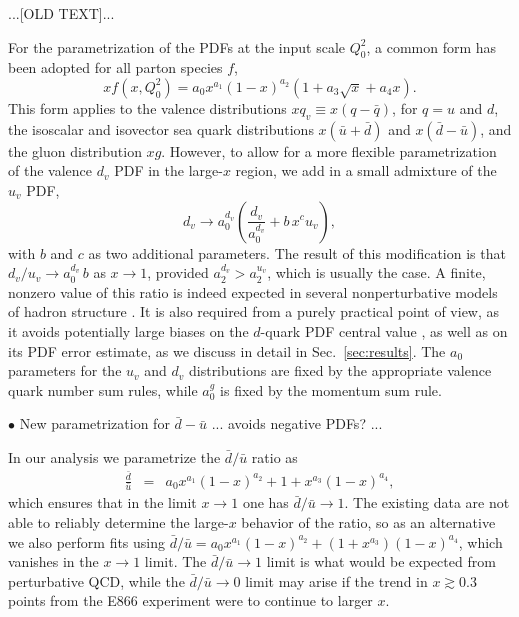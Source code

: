 \documentclass[aps,prd,amsmath,preprint]{revtex4}
\begin{document}
{\color{blue}
...[OLD TEXT]...

For the parametrization of the PDFs at the input scale $Q_0^2$,
a common form has been adopted for all parton species $f$,
%
\begin{equation}
xf(x,Q_0^2) = a_0 x^{a_1} (1-x)^{a_2} (1 + a_3 \sqrt{x} + a_4 x).
\label{eq:param}
\end{equation}   
%
This form applies to the valence distributions
  $xq_v \equiv x(q-\bar q)$, for $q=u$ and $d$,
the isoscalar and isovector sea quark distributions
  $x(\bar u + \bar d)$ and $x(\bar d - \bar u)$,
and the gluon distribution $xg$.
However, to allow for a more flexible parametrization of the valence
$d_v$ PDF in the large-$x$ region, we add in a small admixture of the
$u_v$ PDF,
%
\begin{equation}
d_v \rightarrow
    a_0^{d_v} \left( \frac{d_v}{a_0^{d_v}} + b\, x^c u_v \right),
\label{eq:du}
\end{equation}
%
with $b$ and $c$ as two additional parameters.
The result of this modification is that
	$d_v/u_v \to a_0^{d_v}\, b$ as $x \to 1$,
provided $a_2^{d_v} > a_2^{u_v}$, which is usually the case.
A finite, nonzero value of this ratio is indeed expected in several
nonperturbative models of hadron structure \cite{FJ75, MT96, HR10}.
It is also required from a purely practical point of view, as it avoids
potentially large biases on the $d$-quark PDF central value \cite{CJ11},
as well as on its PDF error estimate, as we discuss in detail in
Sec.~\ref{sec:results}.
The $a_0$ parameters for the $u_v$ and $d_v$ distributions are fixed
by the appropriate valence quark number sum rules, while $a_0^g$ is
fixed by the momentum sum rule.
}


$\bullet$
New parametrization for $\bar d - \bar u$ ... avoids negative PDFs?
...

In our analysis we parametrize the $\bar d/\bar u$ ratio as
%
\begin{eqnarray}
\frac{\bar d}{\bar u}
&=& a_0 x^{a_1} (1-x)^{a_2} + 1 + x^{a_3} (1-x)^{a_4},
\end{eqnarray}
%
which ensures that in the limit $x \to 1$ one has $\bar d/\bar u \to 1$.
%
The existing data are not able to reliably determine the large-$x$
behavior of the ratio, so as an alternative we also perform fits
using
$\bar d/\bar u = a_0 x^{a_1} (1-x)^{a_2} + (1 + x^{a_3}) (1-x)^{a_4}$,
which vanishes in the $x \to 1$ limit.
The $\bar d/\bar u \to 1$ limit is what would be expected from
perturbative QCD, while the $\bar d/\bar u \to 0$ limit may arise
if the trend in $x \gtrsim 0.3$ points from the E866 experiment
\cite{E866} were to continue to larger $x$.
\end{document}
